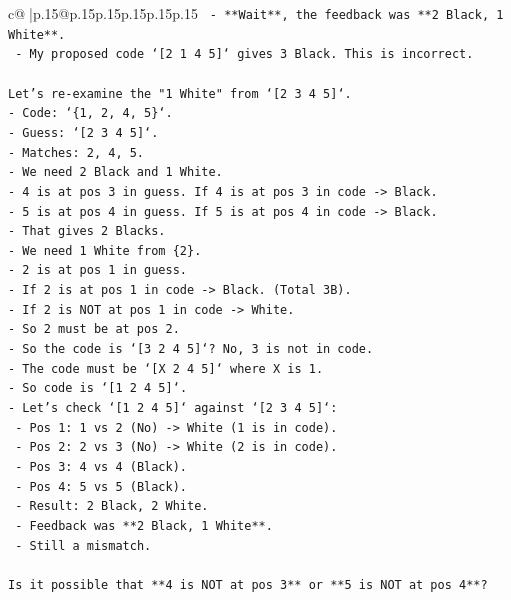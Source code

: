 \documentclass{article}
\begin{document}
{\begin{supertabular}{c@{$\;$}|p{.15\linewidth}@{}p{.15\linewidth}p{.15\linewidth}p{.15\linewidth}p{.15\linewidth}p{.15\linewidth}}
{{{\texttt{         {-} **Wait**, the feedback was **2 Black, 1 White**.} \\
\texttt{         {-} My proposed code `{[}2 1 4 5{]}` gives 3 Black. This is incorrect.} \\
\\ 
\texttt{Let's re{-}examine the "1 White" from `{[}2 3 4 5{]}`.} \\
\texttt{{-} Code: `\{1, 2, 4, 5\}`.} \\
\texttt{{-} Guess: `{[}2 3 4 5{]}`.} \\
\texttt{{-} Matches: 2, 4, 5.} \\
\texttt{{-} We need 2 Black and 1 White.} \\
\texttt{{-} 4 is at pos 3 in guess. If 4 is at pos 3 in code {-}> Black.} \\
\texttt{{-} 5 is at pos 4 in guess. If 5 is at pos 4 in code {-}> Black.} \\
\texttt{{-} That gives 2 Blacks.} \\
\texttt{{-} We need 1 White from \{2\}.} \\
\texttt{{-} 2 is at pos 1 in guess.} \\
\texttt{{-} If 2 is at pos 1 in code {-}> Black. (Total 3B).} \\
\texttt{{-} If 2 is NOT at pos 1 in code {-}> White.} \\
\texttt{{-} So 2 must be at pos 2.} \\
\texttt{{-} So the code is `{[}3 2 4 5{]}`? No, 3 is not in code.} \\
\texttt{{-} The code must be `{[}X 2 4 5{]}` where X is 1.} \\
\texttt{{-} So code is `{[}1 2 4 5{]}`.} \\
\texttt{{-} Let's check `{[}1 2 4 5{]}` against `{[}2 3 4 5{]}`:} \\
\texttt{  {-} Pos 1: 1 vs 2 (No) {-}> White (1 is in code).} \\
\texttt{  {-} Pos 2: 2 vs 3 (No) {-}> White (2 is in code).} \\
\texttt{  {-} Pos 3: 4 vs 4 (Black).} \\
\texttt{  {-} Pos 4: 5 vs 5 (Black).} \\
\texttt{  {-} Result: 2 Black, 2 White.} \\
\texttt{  {-} Feedback was **2 Black, 1 White**.} \\
\texttt{  {-} Still a mismatch.} \\
\\ 
\texttt{Is it possible that **4 is NOT at pos 3** or **5 is NOT at pos 4**?} \\
}}}
\end{supertabular}}
\end{document}
